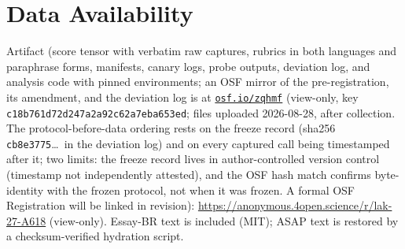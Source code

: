 \documentclass[fleqn,10pt]{JLA_article}
\begin{document}
\section*{Data Availability}
Artifact (score tensor with verbatim raw captures, rubrics in both languages and paraphrase forms, manifests, canary logs, probe outputs, deviation log, and analysis code with pinned environments; an OSF mirror of the pre-registration, its amendment, and the deviation log is at \href{https://osf.io/zqhmf/?view_only=c18b761d72d247a2a92c62a7eba653ed}{\texttt{osf.io/zqhmf}} (view-only, key \texttt{c18b761d72d247a2\-a92c62a7eba653ed}; files uploaded 2026-08-28, after collection. The protocol-before-data ordering rests on the freeze record (sha256 \texttt{cb8e3775}\ldots\ in the deviation log) and on every captured call being timestamped after it; two limits: the freeze record lives in author-controlled version control (timestamp not independently attested), and the OSF hash match confirms byte-identity with the frozen protocol, not when it was frozen. A formal OSF Registration will be linked in revision):
\url{https://anonymous.4open.science/r/lak-27-A618} (view-only). Essay-BR text is included (MIT); ASAP text is restored by a checksum-verified hydration script.


\appendix
\renewcommand{\thesection}{\Alph{section}}
\end{document}

